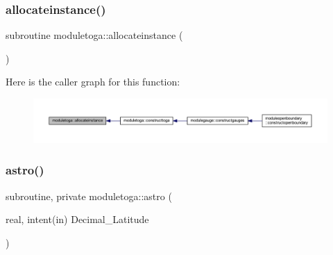 \subsubsection{\texorpdfstring{allocateinstance()}{allocateinstance()}}
{\footnotesize\ttfamily subroutine moduletoga\+::allocateinstance (\begin{DoxyParamCaption}{ }\end{DoxyParamCaption})\hspace{0.3cm}{\ttfamily [private]}}

Here is the caller graph for this function\+:\nopagebreak
\begin{figure}[H]
\begin{center}
\leavevmode
\includegraphics[width=350pt]{namespacemoduletoga_a307ed1550871bbb2f18f8facda132b11_icgraph}
\end{center}
\end{figure}
\mbox{\label{namespacemoduletoga_ae4a4ae3ca80be3e56570e30a039abd61}} 
\subsubsection{\texorpdfstring{astro()}{astro()}}
{\footnotesize\ttfamily subroutine, private moduletoga\+::astro (\begin{DoxyParamCaption}\item[{real, intent(in)}]{Decimal\+\_\+\+Latitude }\end{DoxyParamCaption})\hspace{0.3cm}{\ttfamily [private]}}

